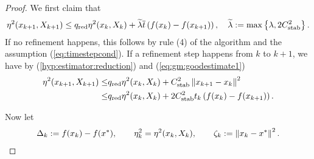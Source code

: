 %
\begin{proof}
We first claim that
%
\begin{equation}\label{eq:gm:help2}
\eta^2(x_{k+1},X_{k+1}) \le q_{\rm red} \eta^2(x_{k}, X_k) + \widetilde{\lambda} \overline{t} \left(f(x_{k})-f(x_{k+1})\right),\quad\widetilde{\lambda} := \max\left\{\lambda,2C_{\rm stab}^2\right\}. 
\end{equation}
%
If no refinement happens, this follows by rule (4) of the algorithm and the assumption (\ref{eq:timestepcond}).
If a refinement step happens from $k$ to $k+1$, we have by (\ref{hyp:estimator:reduction}) and (\ref{eq:gm:goodestimate1})
%
\begin{align*}
\eta^2(x_{k+1},X_{k+1}) \le& q_{\rm red} \eta^2(x_{k}, X_k) + C_{\rm stab}^2\left\|x_{k+1}-x_{k}\right\|^2\\
\le& q_{\rm red} \eta^2(x_{k}, X_k) + 2C_{\rm stab}^2 t_k \left(f(x_{k})-f(x_{k+1})\right).
\end{align*}
%

Now let
%
\begin{align*}
\Delta_{k} := f(x_{k}) -f(x^*),\qquad \eta^2_k = \eta^2(x_{k}, X_k),\qquad \zeta_k:= \left\|x_k-x^*\right\|^2.
\end{align*}
%


\end{proof}
